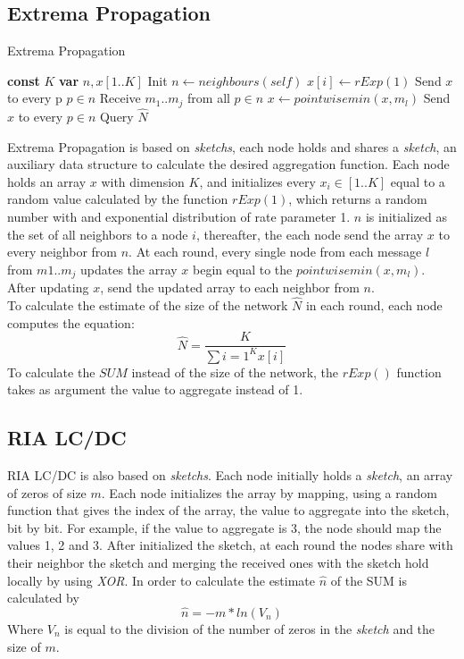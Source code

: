 \subsection{Extrema Propagation}
\begin{algorithm}
\caption{Extrema Propagation}
\begin{algorithmic}
\STATE \textbf{const} $K$
\STATE \textbf{var} $n,x[1..K]$
\REQUIRE Init
\STATE $n \leftarrow neighbours(self)$
\STATE $x[i] \leftarrow rExp(1)$
\ENDFOR
\STATE Send $x$ to every p $p \in n$
\REQUIRE Receive $m_1..m_j$ from all $p \in n$
\STATE $x \leftarrow pointwisemin(x,m_l)$
\ENDFOR
\STATE Send $x$ to every $p \in n$ 
\REQUIRE Query
\RETURN $\hat{N}$
\end{algorithmic}
\end{algorithm}
Extrema Propagation \cite{baquero2012extrema} is based on \textit{sketchs}, each node holds and shares a \textit{sketch}, an auxiliary data structure to calculate the desired aggregation function. Each node holds an array $x$ with dimension $K$, and initializes every $x_i \in [1..K]$ equal to a random value calculated by the function $rExp(1)$, which returns a random number with and exponential distribution of rate parameter 1. $n$ is initialized as the set of all neighbors to a node $i$, thereafter, the each node send the array $x$ to every neighbor from $n$. At each round, every single node from each message $l$ from $m1..m_j$ updates the array $x$ begin equal to the $pointwisemin(x,m_l)$. After updating $x$, send the updated  array to each neighbor from $n$.\\
To calculate the estimate of the size of the network $\hat{N}$ in each round, each node computes the equation:
\begin{equation*}
\hat{N} = \frac{K}{\sum{i=1}^{K} x[i]}
\end{equation*}
To calculate the $SUM$ instead of the size of the network, the $rExp()$ function takes as argument the value to aggregate instead of 1.
\subsection{RIA LC/DC}
RIA LC/DC \cite{fan2010efficient} is also based on \textit{sketchs}. Each node initially holds a \textit{sketch}, an array of zeros of size $m$. Each node initializes the array by mapping, using a random function that gives the index of the array, the value to aggregate into the sketch, bit by bit. For example, if the value to aggregate is 3, the node should map the values 1, 2 and 3. After initialized the sketch, at each round the nodes share with their neighbor the sketch and merging the received ones with the sketch hold locally by using \textit{XOR}. In order to calculate the estimate $\hat{n}$ of the SUM is calculated by
\begin{equation*}
\hat{n} = -m*ln(V_n)
\end{equation*}
Where $V_n$ is equal to the division of the number of zeros in the \textit{sketch} and the size of $m$.
